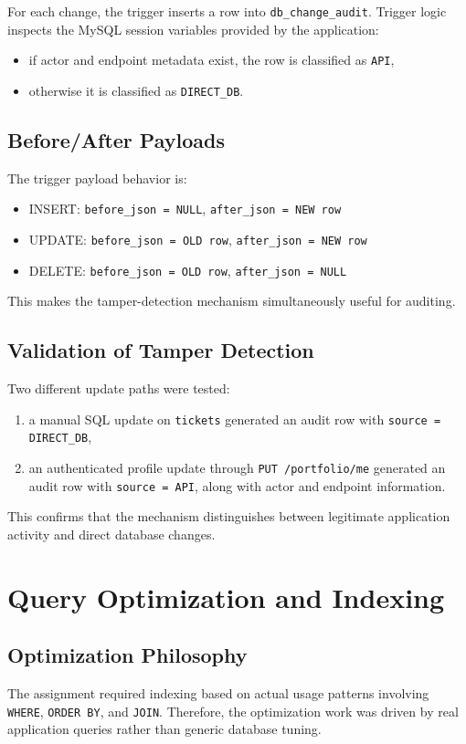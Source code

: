 \documentclass[12pt,a4paper]{article}
\begin{document}
For each change, the trigger inserts a row into \texttt{db\_change\_audit}. Trigger logic inspects the MySQL session variables provided by the application:
\begin{itemize}[leftmargin=1.5em]
    \item if actor and endpoint metadata exist, the row is classified as \texttt{API},
    \item otherwise it is classified as \texttt{DIRECT\_DB}.
\end{itemize}

\subsection{Before/After Payloads}
The trigger payload behavior is:
\begin{itemize}[leftmargin=1.5em]
    \item INSERT: \texttt{before\_json = NULL}, \texttt{after\_json = NEW row}
    \item UPDATE: \texttt{before\_json = OLD row}, \texttt{after\_json = NEW row}
    \item DELETE: \texttt{before\_json = OLD row}, \texttt{after\_json = NULL}
\end{itemize}

This makes the tamper-detection mechanism simultaneously useful for auditing.

\subsection{Validation of Tamper Detection}
Two different update paths were tested:
\begin{enumerate}[leftmargin=1.8em]
    \item a manual SQL update on \texttt{tickets} generated an audit row with \texttt{source = DIRECT\_DB},
    \item an authenticated profile update through \texttt{PUT /portfolio/me} generated an audit row with \texttt{source = API}, along with actor and endpoint information.
\end{enumerate}

This confirms that the mechanism distinguishes between legitimate application activity and direct database changes.

\section{Query Optimization and Indexing}
\subsection{Optimization Philosophy}
The assignment required indexing based on actual usage patterns involving \texttt{WHERE}, \texttt{ORDER BY}, and \texttt{JOIN}. Therefore, the optimization work was driven by real application queries rather than generic database tuning.
\end{document}
